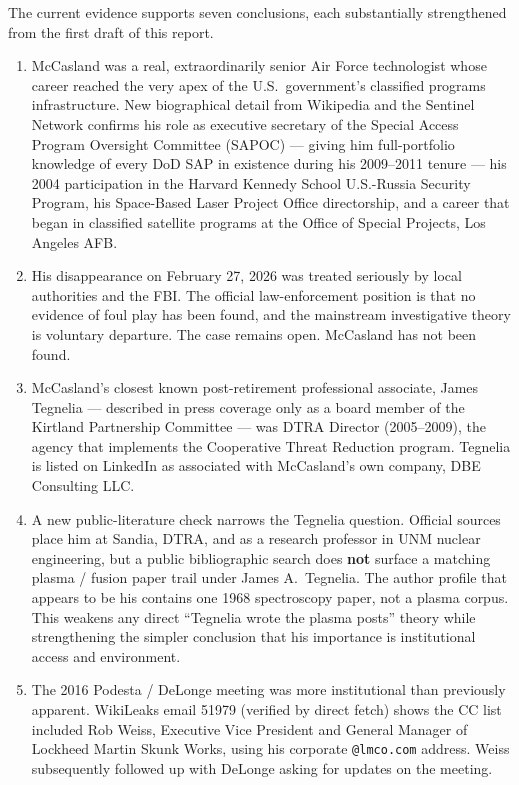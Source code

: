 \documentclass[11pt]{article}
\begin{document}
The current evidence supports seven conclusions, each substantially strengthened from the first draft of this report.

\begin{enumerate}
  \item McCasland was a real, extraordinarily senior Air Force technologist whose career reached the very apex of the U.S.\ government's classified programs infrastructure. New biographical detail from Wikipedia and the Sentinel Network confirms his role as executive secretary of the Special Access Program Oversight Committee (SAPOC) — giving him full-portfolio knowledge of every DoD SAP in existence during his 2009--2011 tenure — his 2004 participation in the Harvard Kennedy School U.S.-Russia Security Program, his Space-Based Laser Project Office directorship, and a career that began in classified satellite programs at the Office of Special Projects, Los Angeles AFB.

  \item His disappearance on February 27, 2026 was treated seriously by local authorities and the FBI. The official law-enforcement position is that no evidence of foul play has been found, and the mainstream investigative theory is voluntary departure. The case remains open. McCasland has not been found.

  \item McCasland's closest known post-retirement professional associate, James Tegnelia — described in press coverage only as a board member of the Kirtland Partnership Committee — was DTRA Director (2005--2009), the agency that implements the Cooperative Threat Reduction program. Tegnelia is listed on LinkedIn as associated with McCasland's own company, DBE Consulting LLC.

  \item A new public-literature check narrows the Tegnelia question. Official sources place him at Sandia, DTRA, and as a research professor in UNM nuclear engineering, but a public bibliographic search does \textbf{not} surface a matching plasma / fusion paper trail under James A.\ Tegnelia. The author profile that appears to be his contains one 1968 spectroscopy paper, not a plasma corpus. This weakens any direct ``Tegnelia wrote the plasma posts'' theory while strengthening the simpler conclusion that his importance is institutional access and environment.

  \item The 2016 Podesta / DeLonge meeting was more institutional than previously apparent. WikiLeaks email 51979 (verified by direct fetch) shows the CC list included Rob Weiss, Executive Vice President and General Manager of Lockheed Martin Skunk Works, using his corporate \texttt{@lmco.com} address. Weiss subsequently followed up with DeLonge asking for updates on the meeting.


\end{enumerate}
\end{document}
